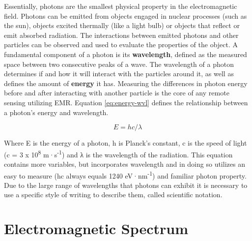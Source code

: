 \documentclass[
]{book}
\begin{document}
Essentially, photons are the smallest physical property in the electromagnetic field. Photons can be emitted from objects engaged in nuclear processes (such as the sun), objects excited thermally (like a light bulb) or objects that reflect or emit absorbed radiation. The interactions between emitted photons and other particles can be observed and used to evaluate the properties of the object. A fundamental component of a photon is its \textbf{wavelength}, defined as the measured space between two consecutive peaks of a wave. The wavelength of a photon determines if and how it will interact with the particles around it, as well as defines the amount of \textbf{energy} it has. Measuring the differences in photon energy before and after interacting with another particle is the core of any remote sensing utilizing EMR. Equation \eqref{eq:energy-wvl} defines the relationship between a photon's energy and wavelength.

\begin{equation}
E = hc/λ 
\label{eq:energy-wvl}
\end{equation}

Where E is the energy of a photon, h is Planck's constant, c is the speed of light (c = 3 x 10\textsuperscript{8} m·s\textsuperscript{-1}) and λ is the wavelength of the radiation. This equation contains more variables, but incorporates wavelength and in doing so utilizes an easy to measure (hc always equals 1240 eV·nm\textsuperscript{-1}) and familiar photon property. Due to the large range of wavelengths that photons can exhibit it is necessary to use a specific style of writing to describe them, called scientific notation.

\section{Electromagnetic Spectrum}\label{electromagnetic-spectrum}
\end{document}
